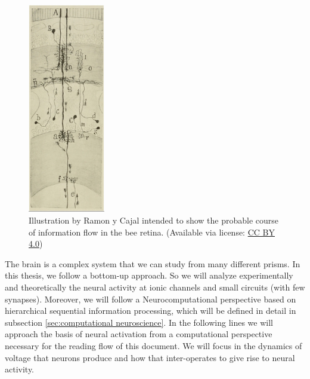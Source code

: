 \begin{figure}[htb!]
    \centering
    \includegraphics[width=0.3\textwidth]{img/intro/cajal-flow_small.jpg}
    \caption{Illustration by Ramon y Cajal intended to show the probable course of information flow in the bee retina. \parencite{ramonycajal_sobre_1915} (Available via license: \href{https://creativecommons.org/licenses/by-sa/4.0/}{CC BY 4.0})}
    \label{cajal-neuron}
\end{figure}


The brain is a complex system that we can study from many different prisms. In this thesis, we follow a bottom-up approach. So we will analyze experimentally and theoretically the neural activity at ionic channels and small circuits (with few synapses). Moreover, we will follow a Neurocomputational perspective based on hierarchical sequential information processing, which will be defined in detail in subsection \ref{sec:computational neuroscience}. In the following lines we will approach the basis of neural activation from a computational perspective necessary for the reading flow of this document. We will focus in the dynamics of voltage that neurons produce and how that inter-operates to give rise to neural activity. 

